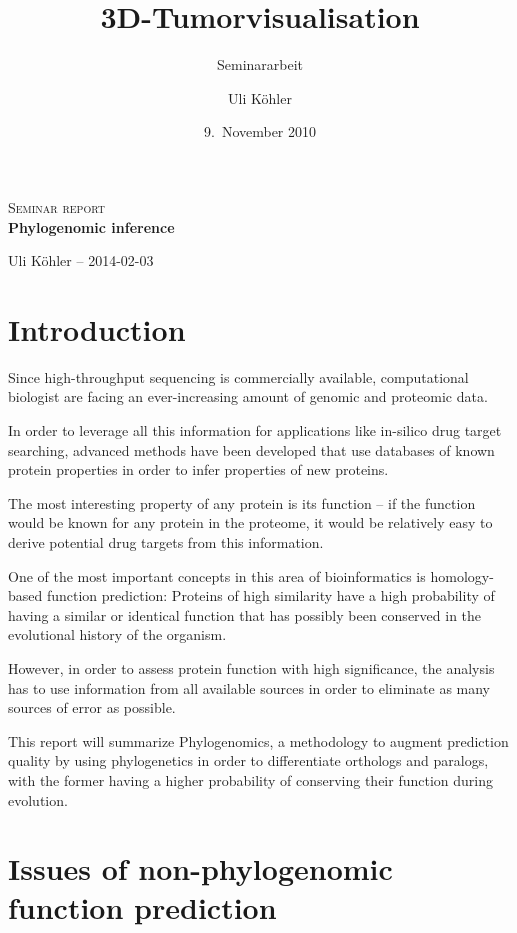 \documentclass[pdftex,paper=A4,DIV=calc,titlepage,12pt]{scrartcl}
\title{3D-Tumorvisualisation}
\subtitle{Seminararbeit}
\author{Uli Köhler}
\date{9.~November 2010}
\newtheorem[L]{boxedDefinition}{Definition}
\begin{document}
\begin{titlepage}
\begin{center}
 \end{center}
\vspace{2cm}
\begin{center}
 \large\textsc{Seminar report}\\[5mm]
 {\Huge\centering\bfseries\selectfont Phylogenomic inference}\\[2cm]
\begin{center}
  Uli Köhler -- 2014-02-03
\end{center}
\vspace{2cm}
\end{center}
\tableofcontents
\end{titlepage}

\section{Introduction}
Since high-throughput sequencing is commercially available, computational biologist are facing an ever-increasing amount of genomic and proteomic data.

In order to leverage all this information for applications like in-silico drug target searching, advanced methods have been developed that use databases of known protein properties in order to infer properties of new proteins.

The most interesting property of any protein is its function -- if the function would be known for any protein in the proteome, it would be relatively easy to derive potential drug targets from this information.

One of the most important concepts in this area of bioinformatics is homology-based function prediction: Proteins of high similarity have a high probability of having a similar or identical function that has possibly been conserved in the evolutional history of the organism.

However, in order to assess protein function with high significance, the analysis has to use information from all available sources in order to eliminate as many sources of error as possible.

This report will summarize Phylogenomics, a methodology to augment prediction quality by using phylogenetics in order to differentiate orthologs and paralogs, with the former having a higher probability of conserving their function during evolution.

\section{Issues of non-phylogenomic function prediction}
\end{document}
